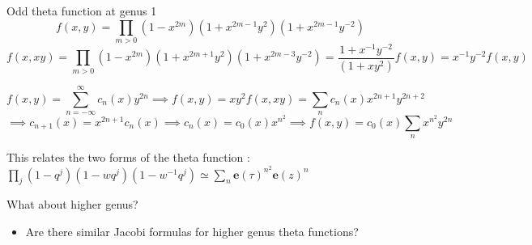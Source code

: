 \documentclass[11pt,aspectratio=169]{beamer}
\newcommand{\ee}[0]{\mathbf{e}}
\begin{document}
\begin{frame}{Odd theta function at genus 1}
    \[f(x,y) = \prod_{m>0} (1-x^{2m})(1+x^{2m-1}y^2)(1+x^{2m-1}y^{-2})\]
    \[f(x,xy) = \prod_{m>0} (1-x^{2m})(1+x^{2m+1}y^2)(1+x^{2m-3}y^{-2}) = \frac{1+x^{-1}y^{-2}}{(1+xy^2)}f(x,y) = x^{-1}y^{-2}f(x,y)\]
    
    \pause{}

    \[f(x,y) = \sum_{n=-\infty}^\infty c_n(x) y^{2n} \implies f(x,y) = xy^2 f(x,xy) = \sum_n c_n(x) x^{2n+1}y^{2n+2}\]
    \[\implies c_{n+1}(x) = x^{2n+1}c_n(x) \implies c_{n}(x) = c_0(x) x^{n^2} \implies f(x,y) = c_0(x) \sum_n x^{n^2} y^{2n}\]

    This relates the two forms of the theta function : $\prod_j (1-q^j) (1-wq^j)(1-w^{-1}q^j) \simeq \sum_n \ee(\tau)^{n^2} \ee(z)^{n}$

    \pause{}

    {
        \begin{block}{What about higher genus?}
            \begin{itemize}
                \item Are there similar Jacobi formulas for higher genus theta functions?
            \end{itemize}
        \end{block}
    }
\end{frame}
\end{document}
